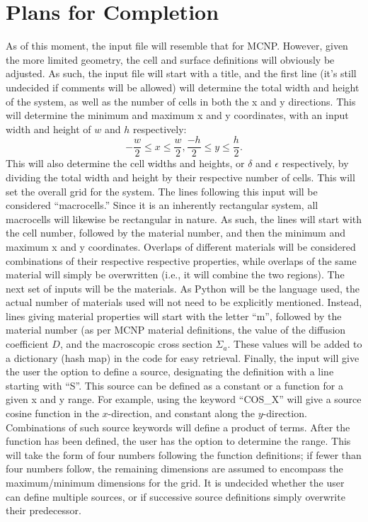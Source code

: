 \section*{Plans for Completion}
As of this moment, the input file will resemble that for MCNP. However, given the more limited geometry, the cell and surface definitions will obviously be adjusted. As such, the input file will start with a title, and the first line (it's still undecided if comments will be allowed) will determine the total width and height of the system, as well as the number of cells in both the x and y directions. This will determine the minimum and maximum x and y coordinates, with an input width and height of $w$ and $h$ respectively:
$$-\dfrac{w}{2} \leq x \leq \dfrac{w}{2}, \dfrac{-h}{2} \leq y \leq \dfrac{h}{2}.$$
This will also determine the cell widths and heights, or $\delta$ and $\epsilon$ respectively, by dividing the total width and height by their respective number of cells. This will set the overall grid for the system.
The lines following this input will be considered ``macrocells.'' Since it is an inherently rectangular system, all macrocells will likewise be rectangular in nature. As such, the lines will start with the cell number, followed by the material number, and then the minimum and maximum x and y coordinates. Overlaps of different materials will be considered combinations of their respective respective properties, while overlaps of the same material will simply be overwritten (i.e., it will combine the two regions).
The next set of inputs will be the materials. As Python will be the language used, the actual number of materials used will not need to be explicitly mentioned. Instead, lines giving material properties will start with the letter ``m'', followed by the material number (as per MCNP material definitions, the value of the diffusion coefficient $D$, and the macroscopic cross section $\Sigma_a$. These values will be added to a dictionary (hash map) in the code for easy retrieval.
Finally, the input will give the user the option to define a source, designating the definition with a line starting with ``S''. This source can be defined as a constant or a function for a given x and y range. For example, using the keyword ``COS_X'' will give a source cosine function in the $x$-direction, and constant along the $y$-direction. Combinations of such source keywords will define a product of terms. After the function has been defined, the user has the option to determine the range. This will take the form of four numbers following the function definitions; if fewer than four numbers follow, the remaining dimensions are assumed to encompass the maximum/minimum dimensions for the grid. It is undecided whether the user can define multiple sources, or if successive source definitions simply overwrite their predecessor.
